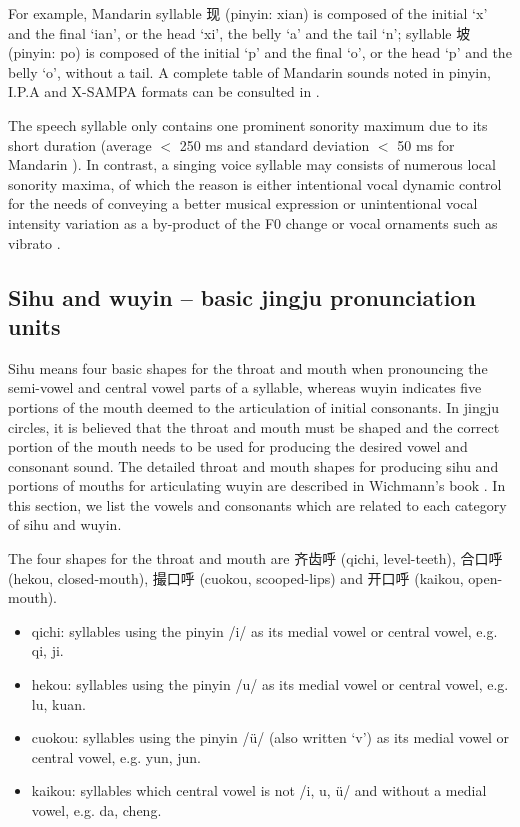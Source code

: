 For example, Mandarin syllable 现 (pinyin: xian) is composed of the initial `x' and the final `ian', or the head `xi', the belly `a' and the tail `n'; syllable 坡 (pinyin: po) is composed of the initial `p' and the final `o', or the head `p' and the belly `o', without a tail. A complete table of Mandarin sounds noted in pinyin, I.P.A and X-SAMPA formats can be consulted in .

The speech syllable only contains one prominent sonority maximum due to its short duration (average $<$ 250 ms and standard deviation $<$ 50 ms for Mandarin \cite{wang_syllable_1994}). In contrast, a singing voice syllable may consists of numerous local sonority maxima, of which the reason is either intentional vocal dynamic control for the needs of conveying a better musical expression or unintentional vocal intensity variation as a by-product of the F0 change \cite{titze_vocal_1992} or vocal ornaments such as vibrato \cite{horii_note_1988}.

\subsection{Sihu and wuyin -- basic jingju pronunciation units}

Sihu means four basic shapes for the throat and mouth when pronouncing the semi-vowel and central vowel parts of a syllable, whereas wuyin indicates five portions of the mouth deemed to the articulation of initial consonants. In jingju circles, it is believed that the throat and mouth must be shaped and the correct portion of the mouth needs to be used for producing the desired vowel and consonant sound. The detailed throat and mouth shapes for producing sihu and portions of mouths for articulating wuyin are described in Wichmann's book \cite{Wichmann1991a}. In this section, we list the vowels and consonants which are related to each category of sihu and wuyin.

The four shapes for the throat and mouth are 齐齿呼 (qichi, level-teeth), 合口呼 (hekou, closed-mouth), 撮口呼 (cuokou, scooped-lips) and 开口呼 (kaikou, open-mouth). 
\begin{itemize}
\item qichi: syllables using the pinyin /i/ as its medial vowel or central vowel, e.g. qi, ji.
\item hekou: syllables using the pinyin /u/ as its medial vowel or central vowel, e.g. lu, kuan.
\item cuokou: syllables using the pinyin /ü/ (also written `v') as its medial vowel or central vowel, e.g. yun, jun.
\item kaikou: syllables which central vowel is not /i, u, ü/ and without a medial vowel, e.g. da, cheng.
\end{itemize}

